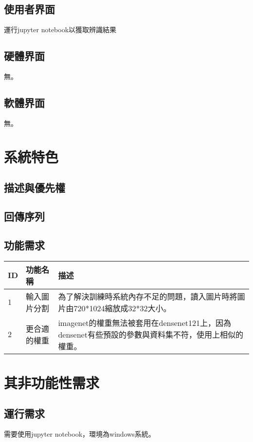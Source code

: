 \documentclass{scrreprt}
\begin{document}
\section{使用者界面}
運行jupyter notebook以獲取辨識結果
\section{硬體界面}
無。
\section{軟體界面}
無。
\chapter{系統特色}
\section{描述與優先權}
\section{回傳序列}
\section{功能需求}
\begin{center}
	\begin{tabular}[t]{|l|l|p{10cm}|}
		\hline
		ID & 功能名稱 & 描述 \\
		\hline
		1 & 輸入圖片分割 & 為了解決訓練時系統內存不足的問題，讀入圖片時將圖片由720*1024縮放成32*32大小。 \\
		\hline
		2 & 更合適的權重 & imagenet的權重無法被套用在densenet121上，因為densenet有些預設的參數與資料集不符，使用上相似的權重。 \\
		\hline
	\end{tabular}
\end{center}
\chapter{其非功能性需求}
\section{運行需求}
需要使用jupyter notebook，環境為windows系統。

\end{document}
